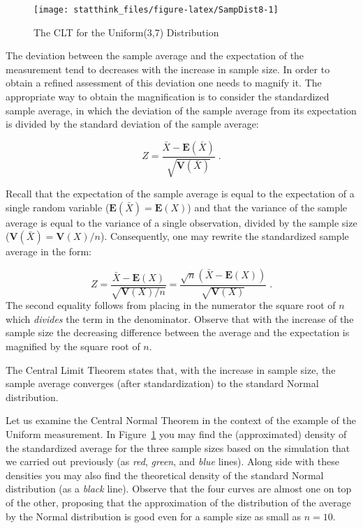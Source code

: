 \documentclass[
]{krantz}
\newcommand{\Expec}{\mathbf{E}}
\newcommand{\Var}{\mathbf{V}}
\theoremstyle{definition}
\theoremstyle{definition}
\theoremstyle{definition}
\theoremstyle{remark}
\begin{document}
\begin{figure}

{\centering \texttt{[image: statthink\_files/figure-latex/SampDist8-1]} 

}

\caption{The CLT for the Uniform(3,7) Distribution}\label{fig:SampDist8}
\end{figure}

The deviation between the sample average and the expectation of the
measurement tend to decreases with the increase in sample size. In order
to obtain a refined assessment of this deviation one needs to magnify
it. The appropriate way to obtain the magnification is to consider the
standardized sample average, in which the deviation of the sample
average from its expectation is divided by the standard deviation of the
sample average:

\[Z = \frac{\bar X - \Expec(\bar X)}{\sqrt{\Var(\bar X)}}\;.\]

Recall that the expectation of the sample average is equal to the
expectation of a single random variable (\(\Expec(\bar X) = \Expec(X)\))
and that the variance of the sample average is equal to the variance of
a single observation, divided by the sample size
(\(\Var(\bar X) = \Var(X)/n\)). Consequently, one may rewrite the
standardized sample average in the form:

\[Z = \frac{\bar X - \Expec(X)}{\sqrt{\Var(X)/n}}= \frac{\sqrt{n}(\bar X - \Expec(X))}{\sqrt{\Var(X)}}\;.\]
The second equality follows from placing in the numerator the square
root of \(n\) which \emph{divides} the term in the denominator. Observe that
with the increase of the sample size the decreasing difference between
the average and the expectation is magnified by the square root of \(n\).

The Central Limit Theorem states that, with the increase in sample size,
the sample average converges (after standardization) to the standard
Normal distribution.

Let us examine the Central Normal Theorem in the context of the example
of the Uniform measurement. In Figure~\ref{fig:SampDist8} you may find
the (approximated) density of the standardized average for the three
sample sizes based on the simulation that we carried out previously (as
\emph{red}, \emph{green}, and \emph{blue} lines). Along side with these densities you
may also find the theoretical density of the standard Normal
distribution (as a \emph{black} line). Observe that the four curves are
almost one on top of the other, proposing that the approximation of the
distribution of the average by the Normal distribution is good even for
a sample size as small as \(n=10\).
\end{document}
